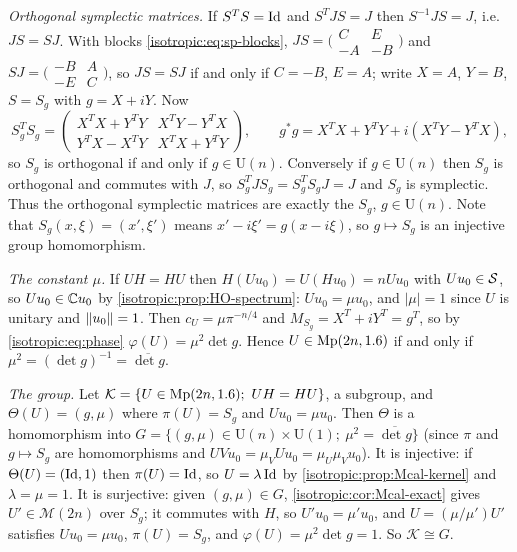 \emph{Orthogonal symplectic matrices.} If $S^TS=\operatorname{Id}$ and $S^TJS=J$ then
$S^{-1}JS=J$, i.e.\ $JS=SJ$. With blocks \eqref{isotropic:eq:sp-blocks},
$JS=\bigl(\begin{smallmatrix}C&E\\-A&-B\end{smallmatrix}\bigr)$ and
$SJ=\bigl(\begin{smallmatrix}-B&A\\-E&C\end{smallmatrix}\bigr)$, so $JS=SJ$ if and only
if $C=-B$, $E=A$; write $X=A$, $Y=B$, $S=S_g$ with $g=X+iY$. Now
\begin{equation*}
  S_g^TS_g=\begin{pmatrix}X^TX+Y^TY&X^TY-Y^TX\\Y^TX-X^TY&X^TX+Y^TY\end{pmatrix},\qquad
  g^*g=X^TX+Y^TY+i(X^TY-Y^TX),
\end{equation*}
so $S_g$ is orthogonal if and only if $g\in\mathrm U(n)$. Conversely if
$g\in\mathrm U(n)$ then $S_g$ is orthogonal and commutes with $J$, so
$S_g^TJS_g=S_g^TS_gJ=J$ and $S_g$ is symplectic. Thus the orthogonal symplectic
matrices are exactly the $S_g$, $g\in\mathrm U(n)$. Note that $S_g(x,\xi)=(x',\xi')$
means $x'-i\xi'=g(x-i\xi)$, so $g\mapsto S_g$ is an injective group homomorphism.

\emph{The constant $\mu$.} If $UH=HU$ then $H(Uu_0)=U(Hu_0)=nUu_0$ with
$Uu_0\in\mathcal{S}$, so $Uu_0\in\mathbb{C} u_0$ by \cref{isotropic:prop:HO-spectrum}:
$Uu_0=\mu u_0$, and $|\mu|=1$ since $U$ is unitary and $\lVert u_0\rVert=1$. Then
$c_U=\mu\pi^{-n/4}$ and $M_{S_g}=X^T+iY^T=g^T$, so by \eqref{isotropic:eq:phase}
$\varphi(U)=\mu^2\det g$. Hence $U\in\mathrm{Mp}(2n,1.6)$ if and only if
$\mu^2=(\det g)^{-1}=\overline{\det g}$.

\emph{The group.} Let $\mathcal K=\{U\in\mathrm{Mp}(2n,1.6);\ UH=HU\}$, a subgroup, and
$\Theta(U)=(g,\mu)$ where $\pi(U)=S_g$ and $Uu_0=\mu u_0$. Then $\Theta$ is a
homomorphism into $G=\{(g,\mu)\in\mathrm U(n)\times\mathrm U(1);\ \mu^2=\overline{\det g}\}$
(since $\pi$ and $g\mapsto S_g$ are homomorphisms and $UVu_0=\mu_V Uu_0=\mu_U\mu_Vu_0$).
It is injective: if $\Theta(U)=(\operatorname{Id},1)$ then $\pi(U)=\operatorname{Id}$, so $U=\lambda\operatorname{Id}$ by
\cref{isotropic:prop:Mcal-kernel} and $\lambda=\mu=1$. It is surjective: given
$(g,\mu)\in G$, \cref{isotropic:cor:Mcal-exact} gives $U'\in\mathcal M(2n)$ over $S_g$;
it commutes with $H$, so $U'u_0=\mu'u_0$, and $U=(\mu/\mu')U'$ satisfies
$Uu_0=\mu u_0$, $\pi(U)=S_g$, and $\varphi(U)=\mu^2\det g=1$. So $\mathcal K\cong G$.

